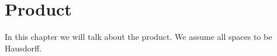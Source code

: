 \chapter{Product}
In this chapter we will talk about the product.
We assume all spaces to be Hausdorff.


